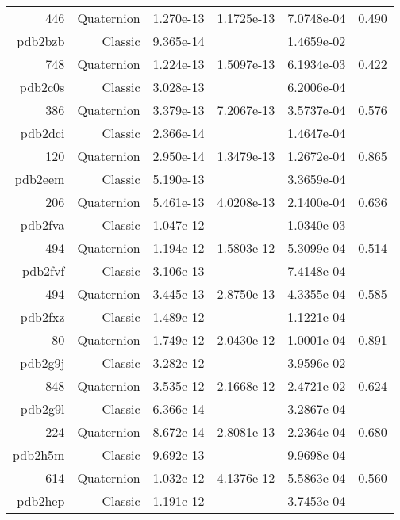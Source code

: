 \begin{xltabular}{\textwidth}{r|rS[table-format=1.3e+2]S[table-format=1.4e+2]S[table-format=1.4e+2]S[table-format=-1.3]}
446 & Quaternion & 1.270e-13 & 1.1725e-13 & 7.0748e-04 & 0.490\\  \addlinespace
{\color{red} pdb2bzb } & Classic & 9.365e-14 &  & 1.4659e-02 & \\
748 & Quaternion & 1.224e-13 & 1.5097e-13 & 6.1934e-03 & 0.422\\  \addlinespace
{\color{red} pdb2c0s } & Classic & 3.028e-13 &  & 6.2006e-04 & \\
386 & Quaternion & 3.379e-13 & 7.2067e-13 & 3.5737e-04 & 0.576\\  \addlinespace
{\color{red} pdb2dci } & Classic & 2.366e-14 &  & 1.4647e-04 & \\
120 & Quaternion & 2.950e-14 & 1.3479e-13 & 1.2672e-04 & 0.865\\  \addlinespace
{\color{red} pdb2eem } & Classic & 5.190e-13 &  & 3.3659e-04 & \\
206 & Quaternion & 5.461e-13 & 4.0208e-13 & 2.1400e-04 & 0.636\\  \addlinespace
{\color{red} pdb2fva } & Classic & 1.047e-12 &  & 1.0340e-03 & \\
494 & Quaternion & 1.194e-12 & 1.5803e-12 & 5.3099e-04 & 0.514\\  \addlinespace
{\color{red} pdb2fvf } & Classic & 3.106e-13 &  & 7.4148e-04 & \\
494 & Quaternion & 3.445e-13 & 2.8750e-13 & 4.3355e-04 & 0.585\\  \addlinespace
{\color{red} pdb2fxz } & Classic & 1.489e-12 &  & 1.1221e-04 & \\
80 & Quaternion & 1.749e-12 & 2.0430e-12 & 1.0001e-04 & 0.891\\  \addlinespace
{\color{red} pdb2g9j } & Classic & 3.282e-12 &  & 3.9596e-02 & \\
848 & Quaternion & 3.535e-12 & 2.1668e-12 & 2.4721e-02 & 0.624\\  \addlinespace
{\color{red} pdb2g9l } & Classic & 6.366e-14 &  & 3.2867e-04 & \\
224 & Quaternion & 8.672e-14 & 2.8081e-13 & 2.2364e-04 & 0.680\\  \addlinespace
{\color{red} pdb2h5m } & Classic & 9.692e-13 &  & 9.9698e-04 & \\
614 & Quaternion & 1.032e-12 & 4.1376e-12 & 5.5863e-04 & 0.560\\  \addlinespace
{\color{red} pdb2hep } & Classic & 1.191e-12 &  & 3.7453e-04 & \\

\end{xltabular}

